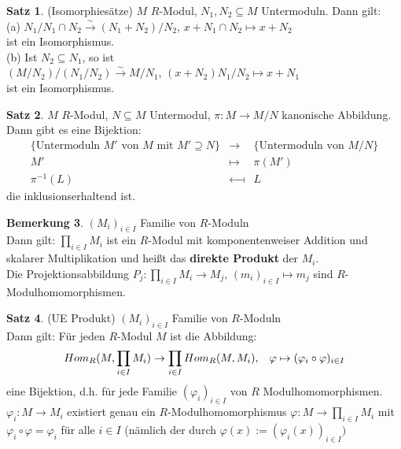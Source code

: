 \documentclass[10pt,a4paper,numbers=endperiod]{scrreprt}
\theoremstyle{definition}
\newtheorem{satz}{Satz}[section]
\newtheorem{bem}[satz]{Bemerkung}
\begin{document}
\begin{satz}
	(Isomorphiesätze)
	$M$ $R$-Modul, $N_1, N_2 \subseteq M$ Untermoduln. Dann gilt:\\
	(a) $N_1/N_1 \cap N_2 \overset{\sim}{\rightarrow} (N_1+N_2)/N_2$, $x + N_1 \cap N_2 \mapsto x + N_2$\\
	ist ein Isomorphismus.\\
	(b) Ist $N_2 \subseteq N_1$, so ist\\
	$(M/N_2)/(N_1/N_2) \overset{\sim}{\rightarrow} M/N_1$, $(x+N_2) N_1/N_2 \mapsto x+ N_1$\\
	ist ein Isomorphismus.
\end{satz}

\begin{satz}
	$M$ $R$-Modul, $N \subseteq M$ Untermodul, $\pi: M \rightarrow M/N$ kanonische Abbildung. Dann gibt es eine Bijektion:
	\begin{eqnarray*}	
	\{\text{Untermoduln } M' \text{ von } M \text{ mit } M' \supseteq N\} &\longrightarrow& \{\text{Untermoduln von } M/N\}\\
	M' &\longmapsto& \pi(M')\\
	\pi^{-1}(L) &\longmapsfrom& L 
	\end{eqnarray*}
	die inklusionserhaltend ist.
\end{satz}

\begin{bem}
	$(M_i)_{i \in I}$ Familie von $R$-Moduln\\
	Dann gilt: $\prod\limits_{i \in I} M_i$ ist ein $R$-Modul mit komponentenweiser Addition und skalarer Multiplikation und heißt das \textbf{direkte Produkt} der $M_i$.\\
	Die Projektionsabbildung $P_j: \prod\limits_{i \in I} M_i \rightarrow M_j$, $(m_i)_{i \in I} \mapsto m_j$ sind $R$-Modulhomomorphismen.
\end{bem}

\begin{satz}
	(UE Produkt) $(M_i)_{i \in I}$ Familie von $R$-Moduln\\
	Dann gilt: Für jeden $R$-Modul $M$ ist die Abbildung:
	\begin{align*}
		Hom_R(M, \prod\limits_{i \in I} M_i) \rightarrow \prod\limits_{i \in I} Hom_R(M, M_i), \hspace{3mm} \varphi \mapsto (\varphi_i \circ \varphi)_{i \in I} 
	\end{align*}
	eine Bijektion, d.h. für jede Familie $(\varphi_i)_{i \in I}$ von $R$ Modulhomomorphismen. $\varphi_i: M \rightarrow M_i$ existiert genau ein $R$-Modulhomomorphismus $\varphi: M \rightarrow \prod_{i \in I} M_i$ mit $\varphi_i \circ \varphi = \varphi_i$ für alle $i \in I$ (nämlich der durch $\varphi(x) := (\varphi_i(x))_{i \in I})$
\end{satz}
\end{document}
